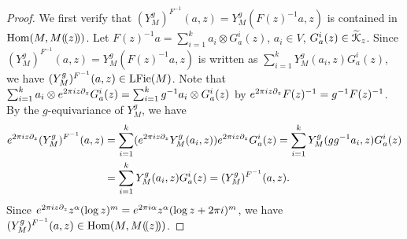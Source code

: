 \documentclass[final,reqno]{amsart}
\begin{document}
\begin{proof}
    We first verify that $(Y^g_M)^{F^{-1}}(a,z)=Y^g_M(F(z)^{-1}a,z)$ is contained in $\operatorname{Hom}(M,M(\!( z )\!))$. Let $F(z)^{-1}a=\sum_{i=1}^ka_i\otimes G^i_a(z)$, $a_i\in V$, $G^i_a(z)\in\widetilde{\EuScript{K}}_z$. Since $(Y^g_M)^{F^{-1}}(a,z)=Y^g_M(F(z)^{-1}a,z)$ is written as $\sum_{i=1}^kY^g_M(a_i,z)G_a^i(z)$, we have $(Y^g_M)^{F^{-1}}(a,z)\in\operatorname{LFie}(M)$. Note that $\sum_{i=1}^ka_i\otimes e^{2\pi iz\partial_z}G_a^i(z)=\sum_{i=1}^kg^{-1}a_i\otimes G^i_a(z)$ by $e^{2\pi iz\partial_z}F(z)^{-1}=g^{-1}F(z)^{-1}$. By the $g$-equivariance of $Y^g_M$, we have
    \begin{align*}
        e^{2\pi iz\partial_z}(Y^g_M)^{F^{-1}}(a,z)
        &=\sum_{i=1}^k(e^{2\pi iz\partial_z}Y^g_M(a_i,z))e^{2\pi iz\partial_z}G^i_a(z)
        =\sum_{i=1}^kY^g_M(gg^{-1}a_i,z)G^i_a(z)\\
        &=\sum_{i=1}^kY^g_M(a_i,z)G^i_a(z)
        =(Y^g_M)^{F^{-1}}(a,z).
    \end{align*}
    Since $e^{2\pi iz\partial_z}z^{\alpha}(\log z)^m=e^{2\pi i\alpha}z^{\alpha}(\log z+2\pi i)^m$, we have $(Y^g_M)^{F^{-1}}(a,z)\in \operatorname{Hom}(M,M(\!( z )\!))$.


\end{proof}
\end{document}
